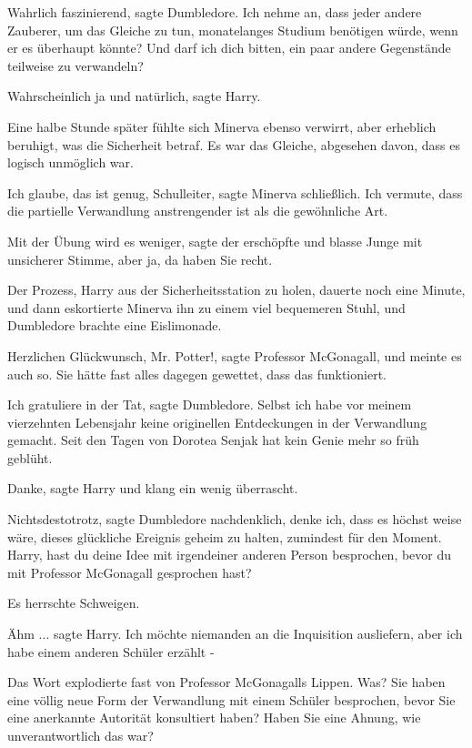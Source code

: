 \glqq{}Wahrlich faszinierend\grqq{}, sagte Dumbledore. \glqq{}Ich nehme an, dass
jeder andere Zauberer, um das Gleiche zu tun, monatelanges Studium benötigen
würde, wenn er es überhaupt könnte? Und darf ich dich bitten, ein paar andere
Gegenstände teilweise zu verwandeln?\grqq{}

\glqq{}Wahrscheinlich ja und natürlich\grqq{}, sagte Harry.

Eine halbe Stunde später fühlte sich Minerva ebenso verwirrt, aber erheblich
beruhigt, was die Sicherheit betraf. Es war das Gleiche, abgesehen davon, dass
es logisch unmöglich war.

\glqq{}Ich glaube, das ist genug, Schulleiter\grqq{}, sagte Minerva schließlich.
\glqq{}Ich vermute, dass die partielle Verwandlung anstrengender ist als die
gewöhnliche Art.\grqq{}

\glqq{}Mit der Übung wird es weniger\grqq{}, sagte der erschöpfte und blasse
Junge mit unsicherer Stimme, \glqq{}aber ja, da haben Sie recht.\grqq{}

Der Prozess, Harry aus der Sicherheitsstation zu holen, dauerte noch eine
Minute, und dann eskortierte Minerva ihn zu einem viel bequemeren Stuhl, und
Dumbledore brachte eine Eislimonade.

\glqq{}Herzlichen Glückwunsch, Mr. Potter!\grqq{}, sagte Professor McGonagall,
und meinte es auch so. Sie hätte fast alles dagegen gewettet, dass das
funktioniert.

\glqq{}Ich gratuliere in der Tat\grqq{}, sagte Dumbledore. \glqq{}Selbst ich
habe vor meinem vierzehnten Lebensjahr keine originellen Entdeckungen in der
Verwandlung gemacht. Seit den Tagen von Dorotea Senjak hat kein Genie mehr so
früh geblüht.\grqq{}

\glqq{}Danke\grqq{}, sagte Harry und klang ein wenig überrascht.

\glqq{}Nichtsdestotrotz\grqq{}, sagte Dumbledore nachdenklich, \glqq{}denke ich,
dass es höchst weise wäre, dieses glückliche Ereignis geheim zu halten,
zumindest für den Moment. Harry, hast du deine Idee mit irgendeiner anderen
Person besprochen, bevor du mit Professor McGonagall gesprochen hast?\grqq{}

Es herrschte Schweigen.

\glqq{}Ähm ...\grqq{} sagte Harry. \glqq{}Ich möchte niemanden an die
Inquisition ausliefern, aber ich habe einem anderen Schüler erzählt -\grqq{}

Das Wort explodierte fast von Professor McGonagalls Lippen. \glqq{}Was? Sie
haben eine völlig neue Form der Verwandlung mit einem Schüler besprochen, bevor
Sie eine anerkannte Autorität konsultiert haben? Haben Sie eine Ahnung, wie
unverantwortlich das war?\grqq{}


